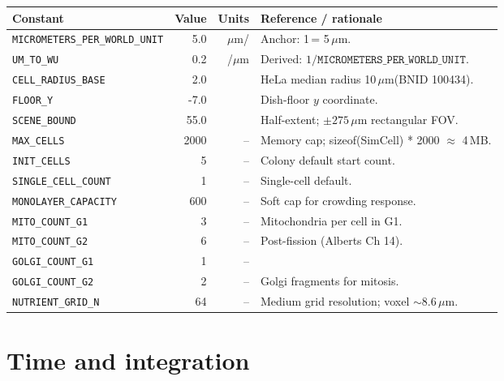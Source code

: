 \documentclass[11pt,letterpaper,twoside,openany]{book}
\newcommand{\code}[1]{\texttt{#1}}
\newcommand{\wu}{\text{wu}}
\newcommand{\um}{\ensuremath{\mu\text{m}}}
\begin{document}
\begin{longtable}{p{4.6cm}rrp{6.0cm}}
\toprule
\textbf{Constant} & \textbf{Value} & \textbf{Units} & \textbf{Reference / rationale}\\ \midrule
\code{MICROMETERS\_PER\_WORLD\_UNIT} & 5.0 & \um/\wu & Anchor: 1\,\wu = 5\,\um.\\
\code{UM\_TO\_WU}             & 0.2 & \wu/\um & Derived: $1/\code{MICROMETERS\_PER\_WORLD\_UNIT}$.\\
\code{CELL\_RADIUS\_BASE}     & 2.0 & \wu    & HeLa median radius 10\,\um (BNID 100434).\\
\code{FLOOR\_Y}               &-7.0 & \wu    & Dish-floor $y$ coordinate.\\
\code{SCENE\_BOUND}           & 55.0 & \wu   & Half-extent; $\pm 275\,\um$ rectangular FOV.\\
\code{MAX\_CELLS}             & 2000 & --    & Memory cap; sizeof(SimCell) * 2000 $\approx$ 4\,MB.\\
\code{INIT\_CELLS}            & 5   & --    & Colony default start count.\\
\code{SINGLE\_CELL\_COUNT}    & 1   & --    & Single-cell default.\\
\code{MONOLAYER\_CAPACITY}    & 600 & --    & Soft cap for crowding response.\\
\code{MITO\_COUNT\_G1}        & 3   & --    & Mitochondria per cell in G1.\\
\code{MITO\_COUNT\_G2}        & 6   & --    & Post-fission (Alberts Ch 14).\\
\code{GOLGI\_COUNT\_G1}       & 1   & --    & \\
\code{GOLGI\_COUNT\_G2}       & 2   & --    & Golgi fragments for mitosis.\\
\code{NUTRIENT\_GRID\_N}      & 64  & --    & Medium grid resolution; voxel $\sim$8.6\,\um.\\
\bottomrule
\end{longtable}

\section{Time and integration}
\end{document}
